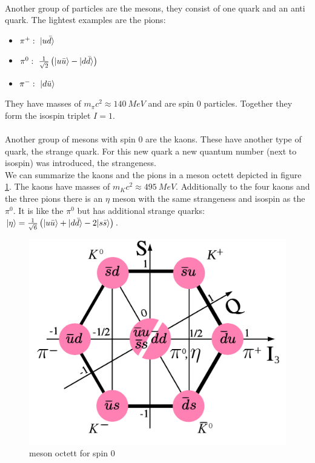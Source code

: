 \\
Another group of particles are the mesons, they consist of one quark and an anti quark. The lightest examples are the pions:
\begin{itemize}
\item $\pi^+:~|u\bar{d}\rangle$
\item $\pi^0:~\frac{1}{\sqrt{2}}\left( |u\bar{u}\rangle - |d \bar{d}\rangle\right)$
\item $\pi^-:~|d\bar{u}\rangle$
\end{itemize}
They have masses of $m_\pi c^2 \approx 140~\si{MeV}$ and are spin $0$ particles. Together they form the isospin triplet $I = 1$.\\
\\
Another group of mesons with spin $0$ are the kaons. These have another type of quark, the strange quark. For this new quark a new quantum number (next to isospin) was introduced, the strangeness.\\
We can summarize the kaons and the pions in a meson octett depicted in figure \ref{1}. The kaons have masses of $m_Kc^2 \approx 495~\si{MeV}$. Additionally to the four kaons and the three pions there is an $\eta$ meson with the same strangeness and isospin as the $\pi^0$. It is like the $\pi^0$ but has additional strange quarks: $|\eta\rangle = \frac{1}{\sqrt{6}}\left( |u\bar{u}\rangle + |d\bar{d}\rangle - 2 | s \bar{s}\rangle\right)$.\\
\begin{figure}[H]
\centering
\includegraphics[scale=0.1]{include/mesonoctett.pdf}
\caption{meson octett for spin $0$}
\label{1}
\end{figure}

